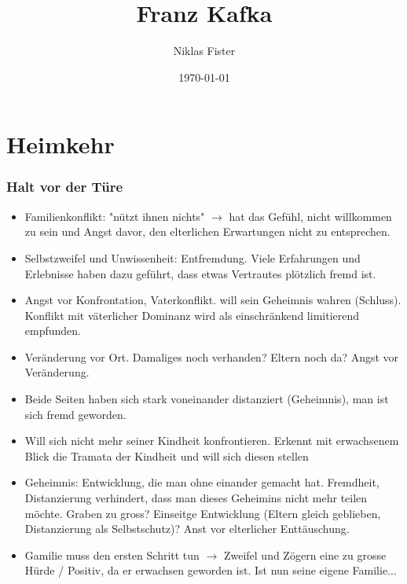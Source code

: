\documentclass{article}
\title{\Huge\textbf{Franz Kafka}}
\author{Niklas Fister}
\date{\today}
\begin{document}
\maketitle
\thispagestyle{empty}
\newpage

\part{Heimkehr}
\section{Halt vor der Türe}
\begin{itemize}[parsep=0pt]
    \item Familienkonflikt: "nützt ihnen nichts" $\rightarrow$ hat das Gefühl, nicht willkommen zu sein und Angst davor, den elterlichen Erwartungen nicht zu entsprechen.
    \item Selbstzweifel und Unwissenheit: Entfremdung. Viele Erfahrungen und Erlebnisse haben dazu geführt, dass etwas Vertrautes plötzlich fremd ist.
    \item Angst vor Konfrontation, Vaterkonflikt. will sein Geheimnis wahren (Schluss). Konflikt mit väterlicher Dominanz wird als einschränkend limitierend empfunden.
    \item Veränderung vor Ort. Damaliges noch verhanden? Eltern noch da? Angst vor Veränderung.
    \item Beide Seiten haben sich stark voneinander distanziert (Geheimnis), man ist sich fremd geworden.
    \item Will sich nicht mehr seiner Kindheit konfrontieren. Erkennt mit erwachsenem Blick die Tramata der Kindheit und will sich diesen stellen
    \item Geheimnis: Entwicklung, die man ohne einander gemacht hat. Fremdheit, Distanzierung verhindert, dass man dieses Geheimins nicht mehr teilen möchte. Graben zu gross? Einseitge Entwicklung (Eltern gleich geblieben, Distanzierung als Selbstschutz)? Anst vor elterlicher Enttäuschung.
    \item Gamilie muss den ersten Schritt tun $\rightarrow$ Zweifel und Zögern eine zu grosse Hürde / Positiv, da er erwachsen geworden ist. Ist nun seine eigene Familie...
\end{itemize}

\newpage
\end{document}
